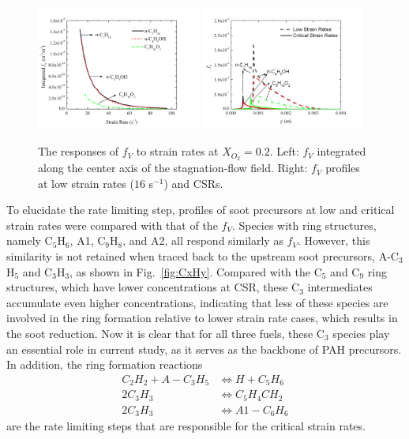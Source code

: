 \documentclass[review,3p,times]{elsarticleUS}
\begin{document}
\begin{figure}[h]
  \centering
  \scriptsize
  \includegraphics[trim=4mm 8mm 30mm 20mm, clip=true, width=0.48\textwidth]{SV-SR.png}
  \includegraphics[trim=4mm 8mm 30mm 20mm, clip=true, width=0.48\textwidth]{fv-y.png}
  \normalsize
  \vspace{-0.2in}
  \caption{The responses of $f_V$ to strain rates at $X_{O_2}=0.2$. Left: $f_V$ integrated along the center axis of the stagnation-flow field. Right: $f_V$ profiles at low strain rates ($16$ s$^{-1}$) and CSRs.}
  \label{fig:fv-SR-combo}
\end{figure}

To elucidate the rate limiting step, profiles of soot precursors at low and critical strain rates were compared with that of the $f_V$. Species with ring structures, namely C$_5$H$_6$, A1, C$_9$H$_8$, and A2, all respond similarly as $f_V$. However, this similarity is not retained when traced back to the upstream soot precursors, A-C$_3$H$_5$ and C$_3$H$_3$, as shown in Fig.~\ref{fig:CxHy}. Compared with the C$_5$ and C$_9$ ring structures, which have lower concentrations at CSR, these C$_3$ intermediates accumulate even higher concentrations, indicating that less of these species are involved in the ring formation relative to lower strain rate cases, which results in the soot reduction. Now it is clear that for all three fuels, these C$_3$ species play an essential role in current study, as it serves as the backbone of PAH precursors. In addition, the ring formation reactions 
\begin{align*}
  C_2H_2 + A-C_3H_5 &\Longleftrightarrow H + C_5H_6\\
  2 C_3H_3 &\Longleftrightarrow C_5H_4CH_2\\
  2 C_3H_3 &\Longleftrightarrow A1-C_6H_6
\end{align*}
are the rate limiting steps that are responsible for the critical strain rates.
\end{document}
